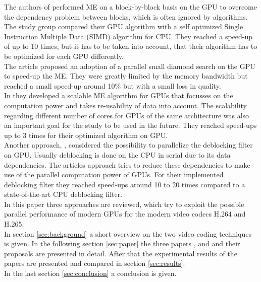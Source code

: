 The authors of \cite{ME2} performed ME on a block-by-block basis on the GPU to overcome the dependency problem between blocks, which is often ignored by algorithms. The study group compared their GPU algorithm with a self optimized Single Instruction Multiple Data (SIMD) algorithm for CPU. They reached a speed-up of up to 10 times, but it has to be taken into account, that their algorithm has to be optimized for each GPU differently.\\

The article \cite{ME3} proposed an adoption of a parallel small diamond search on the GPU to speed-up the ME. They were greatly limited by the memory bandwidth but reached a small speed-up around 10\% but with a small loss in quality.\\

In \cite{ME4} they developed a scalable ME algorithm for GPUs that focusses on the computation power and takes re-usability of data into account. The scalability regarding different number of cores for  GPUs of the same architecture was also an important goal for the study to be used in the future. They reached speed-ups up to 3 times for their optimized algorithm on GPU.\\

Another approach, \cite{deblock1}, considered the possibility to parallelize the deblocking filter  on GPU. Usually deblocking is done on the CPU in serial due to its data dependencies. The articles approach tries to reduce these dependencies to make use of the parallel computation power of GPUs. For their implemented deblocking filter they reached speed-ups around 10 to 20 times compared to a state-of-the-art CPU deblocking filter.\\

In this paper three approaches are reviewed, which try to exploit the possible parallel performance of modern GPUs for the modern video codecs H.264 and H.265. \\
In section \ref{sec:background} a short overview on the two video coding techniques is given. In the following section \ref{sec:paper} the three papers \cite{Paper1}, \cite{Paper2} and \cite{Paper3} and their proposals are presented in detail. After that the experimental results of the papers are presented and compared in section \ref{sec:results}.\\
In the last section \ref{sec:conclusion} a conclusion is given.